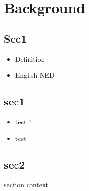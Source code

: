 \chapter{Background}

\section{Sec1}


\begin{itemize}
\item Definition
\item English NED

\end{itemize}

\section{sec1}
\begin{itemize}
\item test 1
\item test
\end{itemize}

\section{sec2}


section content